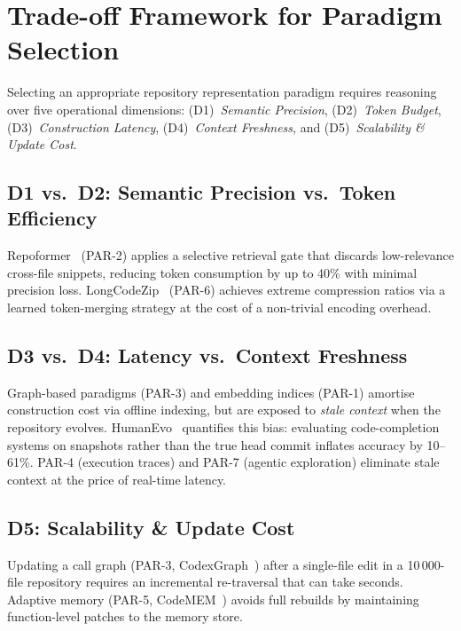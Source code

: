 
\section{Trade-off Framework for Paradigm Selection}
\label{sec:tradeoffs}

Selecting an appropriate repository representation paradigm requires reasoning
over five operational dimensions: (D1)~\emph{Semantic Precision},
(D2)~\emph{Token Budget}, (D3)~\emph{Construction Latency},
(D4)~\emph{Context Freshness}, and (D5)~\emph{Scalability \& Update Cost}.

\subsection{D1 vs.\ D2: Semantic Precision vs.\ Token Efficiency}
Repoformer~\cite{wu2024repoformer} (PAR-2) applies a selective retrieval
gate that discards low-relevance cross-file snippets, reducing token consumption
by up to 40\% with minimal precision loss.  LongCodeZip~\cite{shi2025longcodezip}
(PAR-6) achieves extreme compression ratios via a learned token-merging
strategy at the cost of a non-trivial encoding overhead.

\subsection{D3 vs.\ D4: Latency vs.\ Context Freshness}
Graph-based paradigms (PAR-3) and embedding indices (PAR-1) amortise
construction cost via offline indexing, but are exposed to \emph{stale
context} when the repository evolves.  HumanEvo~\cite{zheng2025humanevo}
quantifies this bias: evaluating code-completion systems on snapshots rather
than the true head commit inflates accuracy by 10–61\%.  PAR-4 (execution
traces) and PAR-7 (agentic exploration) eliminate stale context at the price
of real-time latency.

\subsection{D5: Scalability \& Update Cost}
Updating a call graph (PAR-3, CodexGraph~\cite{liu2025codexgraph}) after a
single-file edit in a 10\,000-file repository requires an incremental
re-traversal that can take seconds.  Adaptive memory (PAR-5,
CodeMEM~\cite{wang2026codemem}) avoids full rebuilds by maintaining
function-level patches to the memory store.


